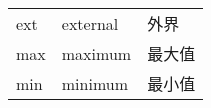 \begin{table}[h]
	\begin{tabularx}{\textwidth}{p{8 em}XX}
		ext			&	external			&	外界			\\
		max			&	maximum				&	最大值			\\
		min			&	minimum				&	最小值			\\
	\end{tabularx}
\end{table}
